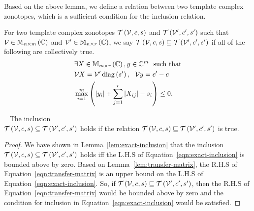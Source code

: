 %
Based on the above lemma, we define a relation between two template
complex zonotopes, which is a sufficient condition for the inclusion
relation.
%
\begin{definition}
For two template complex zonotopes $\mathit{\mathcal{T}}\left(\mathcal{V},c,s\right)$
and $\mathit{\mathcal{T}}\left(\mathcal{V}^\prime,c^\prime,s^\prime\right)$ such that
$\mathcal{V}\in\mathbb{M}_{n\times m}\left(\mathbb{C}\right)$ and
$\mathcal{V}^\prime\in\mathbb{M}_{n\times r}\left(\mathbb{C}\right)$, we say
$\mathit{\mathcal{T}}\left(\mathcal{V},c,s\right)\sqsubseteq\mathit{\mathcal{T}}\left(\mathcal{V}^\prime,c^\prime,s^\prime\right)$
if all of the following are collectively true.
%
\begin{align*}
& \exists X\in\mathbb{M}_{m\times r}\left(\mathbb{C}\right),y\in\mathbb{C}^m~~\text{such
that}\\
& \mathcal{V}X=\mathcal{V}^\prime\operatorname{diag}\left(s^\prime\right),~~\mathcal{V}y=c^\prime-c\\
& \max_{i=1}^m\left(\left|y_i\right|+\sum_{j=1}^r\left|X_{ij}\right|-s_i\right)\leq
0.
\end{align*}
%
\end{definition}
%
\begin{theorem}~\label{thm:suff-inclusion}
The inclusion\\
$\mathit{\mathcal{T}}\left(\mathcal{V},c,s\right)\subseteq\mathit{\mathcal{T}}\left(\mathcal{V}^\prime,c^\prime,s^\prime\right)$
holds if the relation
$\mathit{\mathcal{T}}\left(\mathcal{V},c,s\right)\sqsubseteq\mathit{\mathcal{T}}\left(\mathcal{V}^\prime,c^\prime,s^\prime\right)$
is true.
\end{theorem}
%
\begin{proof}
We have shown in Lemma~\ref{lem:exact-inclusion} that the inclusion
$\mathit{\mathcal{T}}\left(\mathcal{V},c,s\right)\subseteq\mathit{\mathcal{T}}\left(\mathcal{V}^\prime,c^\prime,s^\prime\right)$
holds iff the L.H.S of Equation~\ref{eqn:exact-inclusion} is bounded
above by zero.  Based on Lemma~\ref{lem:transfer-matrix}, the R.H.S of
Equation~\ref{eqn:transfer-matrix} is an upper bound on the L.H.S of
Equation~\ref{eqn:exact-inclusion}.  So, if
$\mathit{\mathcal{T}}\left(\mathcal{V},c,s\right)\sqsubseteq\mathit{\mathcal{T}}\left(\mathcal{V}^\prime,c^\prime,s^\prime\right)$,
then the R.H.S of Equation~\ref{eqn:transfer-matrix} would be
bounded above by zero and the condition for inclusion in
Equation~\ref{eqn:exact-inclusion} would be satisfied.
\end{proof}
%
%
